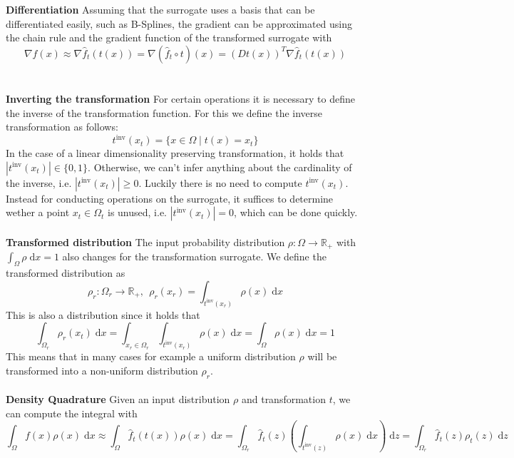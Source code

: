 \documentclass[
  a4paper,  %
  twoside,  %
  bibliography=totoc,
  headsepline,
  cleardoublepage=empty,
  parskip=half,
  draft=false
]{scrbook}
\begin{document}
\textbf{Differentiation }
Assuming that the surrogate uses a basis that can be differentiated easily, such as B-Splines, the gradient can be approximated using the chain rule and the gradient function of the transformed surrogate with
\begin{equation}
\nabla f(x) \approx \nabla \hat{f}_t(t(x)) = \nabla (\hat{f}_t \circ t)(x)=(Dt(x))^T \nabla \hat{f}_t(t(x))
\end{equation}
\\
\\
\textbf{Inverting the transformation  }
For certain operations it is necessary to define the inverse of the transformation function.
For this we define the inverse transformation as follows:
\begin{equation}
t^{\text{inv}}(x_{t})=\{x \in \Omega \mid t(x)=x_{t}\}
\end{equation}
In the case of a linear dimensionality preserving transformation, it holds that $|t^{\text{inv}}(x_{t})| \in \{0,1\}$.
Otherwise, we can't infer anything about the cardinality of the inverse, i.e. $|t^{\text{inv}}(x_{t})| \geq 0$.
Luckily there is no need to compute $t^{\text{inv}}(x_{t})$. Instead for conducting operations on the surrogate, it suffices to determine wether a point $x_t \in \Omega_t$ is unused, i.e. $|t^{\text{inv}}(x_{t})| = 0$, which can be done quickly.
\\
\\
\textbf{Transformed distribution}
The input probability distribution $\rho \colon \Omega \to \mathds{R_+}$ with $\int_{\Omega} \rho \; \text{d}x = 1$ also changes for the transformation surrogate.
We define the transformed distribution as
\begin{equation}
\rho_r \colon \Omega_r \to \mathds{R_+}, ~~ \rho_r(x_r)=\int_{t^{\text{inv}}(x_r)} \rho(x) \; \text{d}x 
\end{equation}
This is also a distribution since it holds that
\begin{equation}
\int_{\Omega_r} \rho_r(x_t) \; \text{d}x=\int_{x_r \in \Omega_r} \int_{t^{\text{inv}}(x_r)} \rho(x) \; \text{d}x = \int_{\Omega} \rho(x) \; \text{d}x = 1
\end{equation}
This means that in many cases for example a uniform distribution $\rho$ will be transformed into a non-uniform distribution $\rho_r$.
\\
\\
\textbf{Density Quadrature}
Given an input distribution $\rho$ and transformation $t$, we can compute the integral with
\begin{equation}
\int_{\Omega} f(x) \rho(x) \; \text{d}x \approx \int_{\Omega} \hat{f}_t(t(x)) \rho(x) \; \text{d}x
=
\int_{\Omega_r} \hat{f}_t(z) \left(\int_{t^{\text{inv}}(z)} \rho(x)  \; \text{d}x \right)  \; \text{d}z=
\int_{\Omega_r} \hat{f}_t(z) \rho_t(z) \; \text{d}z
\end{equation}
\end{document}
